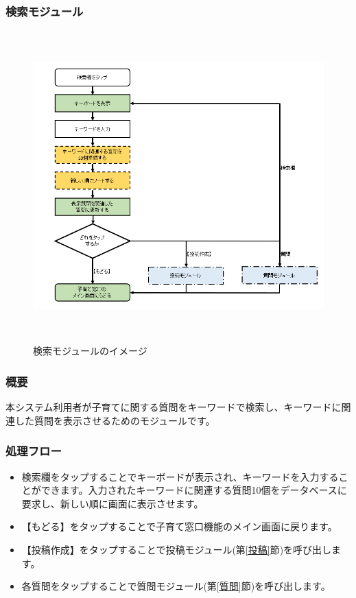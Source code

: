 \documentclass[a4j]{jarticle}
\begin{document}
\subsubsection{検索モジュール\label{検索}} %
\begin{figure}[H]
    \begin{center}
      \includegraphics[height = 12.0cm] {子育て窓口_検索.png} %
    \caption {検索モジュールのイメージ}
    \label{functionselection}
    \end{center}
\end{figure}
\subsubsection*{概要}
本システム利用者が子育てに関する質問をキーワードで検索し、キーワードに関連した質問を表示させるためのモジュールです。
\subsubsection*{処理フロー}
\begin{itemize}
\item 検索欄をタップすることでキーボードが表示され、キーワードを入力することができます。入力されたキーワードに関連する質問10個をデータベースに要求し、新しい順に画面に表示させます。
\item 【もどる】をタップすることで子育て窓口機能のメイン画面に戻ります。
\item 【投稿作成】をタップすることで投稿モジュール(第\ref{投稿}節)を呼び出します。
\item 各質問をタップすることで質問モジュール(第\ref{質問}節)を呼び出します。


\end{itemize}
\end{document}
